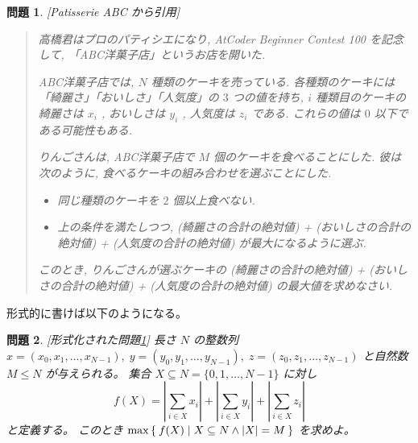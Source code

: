 \documentclass{ltjsarticle}
\newtheorem{problem*}{問題}[section]
\newenvironment{problem}{\begin{problem*}\renewcommand{\qedsymbol}{\(\diamond\)}\pushQED{\qed}}{\popQED\end{problem*}}
\begin{document}
\begin{problem}[Patisserie ABC から引用]
    \label{patisserie-abc}
    \begin{quotation}
        高橋君はプロのパティシエになり, AtCoder Beginner Contest 100 を記念して, 「ABC洋菓子店」というお店を開いた.

        ABC洋菓子店では, $N$ 種類のケーキを売っている.
        各種類のケーキには「綺麗さ」「おいしさ」「人気度」の $3$ つの値を持ち, $i$ 種類目のケーキの綺麗さは $x_i$ , おいしさは $y_i$ , 人気度は $z_i$ である.
        これらの値は $0$ 以下である可能性もある.

        りんごさんは, ABC洋菓子店で $M$ 個のケーキを食べることにした.
        彼は次のように, 食べるケーキの組み合わせを選ぶことにした.
        \begin{itemize}
            \item 同じ種類のケーキを $2$ 個以上食べない.
            \item 上の条件を満たしつつ, (綺麗さの合計の絶対値) + (おいしさの合計の絶対値) + (人気度の合計の絶対値) が最大になるように選ぶ.
        \end{itemize}
        このとき, りんごさんが選ぶケーキの (綺麗さの合計の絶対値) + (おいしさの合計の絶対値) + (人気度の合計の絶対値) の最大値を求めなさい.
    \end{quotation}
\end{problem}

形式的に書けば以下のようになる。

\begin{problem}[形式化された問題\ref{patisserie-abc}]
    \label{patisserie-abc-formal}
    長さ $N$ の整数列 $x = (x_0, x_1, \dots, x _ {N - 1}), \; y = (y_0, y_1, \dots, y _ {N - 1}), \; z = (z_0, z_1, \dots, z _ {N - 1})$ と自然数 $M \le N$ が与えられる。
    集合 $X \subseteq N = \{ 0, 1, \dots, N - 1 \}$ に対し
    \[
        f(X) = \left|\sum_{i \in X} x_i\right| + \left|\sum_{i \in X} y_i\right| + \left|\sum_{i \in X} z_i\right|
    \]
    と定義する。
    このとき $\max \Set{ f(X) | X \subseteq N \land \lvert X \rvert = M }$ を求めよ。
\end{problem}
\end{document}
